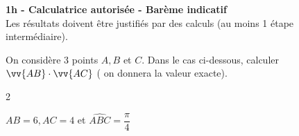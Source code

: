 \documentclass[12pt,a4paper]{article}  %
\begin{document}
\graphicspath{{../images/}}

\begin{center}

\end{center}


\begin{center}\textbf{1h - Calculatrice autorisée - Barème indicatif}\\
Les résultats doivent être justifiés par des calculs (au moins 1 étape intermédiaire).
\end{center}

\vspace{-.3cm} 
On considère 3 points $A, B$ et $C$. Dans le cas ci-dessous, calculer $\vv{A B} \cdot \vv{A C}$ ( on donnera la valeur exacte).
\begin{multicols}{2}
\begin{enumMet}
    \item $A B=6, A C=4$ et $\widehat{A B C}=\dfrac{\pi}{4}$
\end{enumMet}
\end{multicols}
\end{document}
